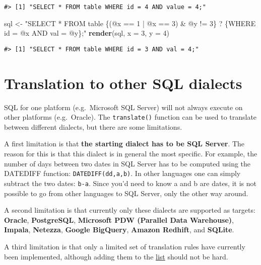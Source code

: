 \documentclass[
]{article}
\newenvironment{Shaded}{\begin{snugshade}}{\end{snugshade}}
\newcommand{\DataTypeTok}[1]{\textcolor[rgb]{0.13,0.29,0.53}{#1}}
\newcommand{\DecValTok}[1]{\textcolor[rgb]{0.00,0.00,0.81}{#1}}
\newcommand{\KeywordTok}[1]{\textcolor[rgb]{0.13,0.29,0.53}{\textbf{#1}}}
\newcommand{\NormalTok}[1]{#1}
\newcommand{\StringTok}[1]{\textcolor[rgb]{0.31,0.60,0.02}{#1}}
\begin{document}
\begin{verbatim}
#> [1] "SELECT * FROM table WHERE id = 4 AND value = 4;"
\end{verbatim}

\begin{Shaded}
\begin{Highlighting}[]
\NormalTok{sql <-}\StringTok{ "SELECT * FROM table \{(@x == 1 | @x == 3) & @y != 3\} ? \{WHERE id = @x AND val = @y\};"}
\KeywordTok{render}\NormalTok{(sql, }\DataTypeTok{x =} \DecValTok{3}\NormalTok{, }\DataTypeTok{y =} \DecValTok{4}\NormalTok{)}
\end{Highlighting}
\end{Shaded}

\begin{verbatim}
#> [1] "SELECT * FROM table WHERE id = 3 AND val = 4;"
\end{verbatim}

\hypertarget{translation-to-other-sql-dialects}{%
\section{Translation to other SQL
dialects}\label{translation-to-other-sql-dialects}}

SQL for one platform (e.g.~Microsoft SQL Server) will not always execute
on other platforms (e.g.~Oracle). The \texttt{translate()} function can
be used to translate between different dialects, but there are some
limitations.

A first limitation is that \textbf{the starting dialect has to be SQL
Server}. The reason for this is that this dialect is in general the most
specific. For example, the number of days between two dates in SQL
Server has to be computed using the DATEDIFF function:
\texttt{DATEDIFF(dd,a,b)}. In other languages one can simply subtract
the two dates: \texttt{b-a}. Since you'd need to know a and b are dates,
it is not possible to go from other languages to SQL Server, only the
other way around.

A second limitation is that currently only these dialects are supported
as targets: \textbf{Oracle}, \textbf{PostgreSQL}, \textbf{Microsoft PDW
(Parallel Data Warehouse)}, \textbf{Impala}, \textbf{Netezza},
\textbf{Google BigQuery}, \textbf{Amazon Redhift}, and \textbf{SQLite}.

A third limitation is that only a limited set of translation rules have
currently been implemented, although adding them to the
\href{https://github.com/OHDSI/SqlRender/blob/master/inst/csv/replacementPatterns.csv}{list}
should not be hard.
\end{document}
